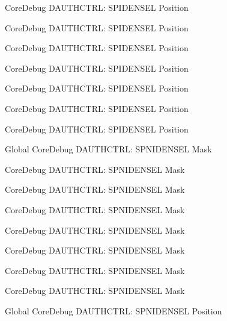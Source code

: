 \begin{DoxyRefList}
\label{deprecated__deprecated000284}%
%
Core\+Debug DAUTHCTRL\+: SPIDENSEL Position 

\label{deprecated__deprecated000439}%
%
Core\+Debug DAUTHCTRL\+: SPIDENSEL Position 

\label{deprecated__deprecated000542}%
%
Core\+Debug DAUTHCTRL\+: SPIDENSEL Position 

\label{deprecated__deprecated000363}%
%
Core\+Debug DAUTHCTRL\+: SPIDENSEL Position 

\label{deprecated__deprecated000644}%
%
Core\+Debug DAUTHCTRL\+: SPIDENSEL Position 

\label{deprecated__deprecated000221}%
%
Core\+Debug DAUTHCTRL\+: SPIDENSEL Position 

\label{deprecated__deprecated000091}%
%
Core\+Debug DAUTHCTRL\+: SPIDENSEL Position  
\item[Global \doxylink{group___c_m_s_i_s___s_c_b_gaabb5d6c750c9ec50254134ece2111dcd}{Core\+Debug\+\_\+\+DAUTHCTRL\+\_\+\+SPNIDENSEL\+\_\+\+Msk} ]\label{deprecated__deprecated000142}%
%
Core\+Debug DAUTHCTRL\+: SPNIDENSEL Mask 

\label{deprecated__deprecated000436}%
%
Core\+Debug DAUTHCTRL\+: SPNIDENSEL Mask 

\label{deprecated__deprecated000088}%
%
Core\+Debug DAUTHCTRL\+: SPNIDENSEL Mask 

\label{deprecated__deprecated000360}%
%
Core\+Debug DAUTHCTRL\+: SPNIDENSEL Mask 

\label{deprecated__deprecated000539}%
%
Core\+Debug DAUTHCTRL\+: SPNIDENSEL Mask 

\label{deprecated__deprecated000641}%
%
Core\+Debug DAUTHCTRL\+: SPNIDENSEL Mask 

\label{deprecated__deprecated000218}%
%
Core\+Debug DAUTHCTRL\+: SPNIDENSEL Mask 

\label{deprecated__deprecated000281}%
%
Core\+Debug DAUTHCTRL\+: SPNIDENSEL Mask  
\item[Global \doxylink{group___c_m_s_i_s___s_c_b_ga866734a8e4bec2d6cf091e265c6c0f3d}{Core\+Debug\+\_\+\+DAUTHCTRL\+\_\+\+SPNIDENSEL\+\_\+\+Pos} ]\label{deprecated__deprecated000538}%
%
Core\+Debug DAUTHCTRL\+: SPNIDENSEL Position 


\end{DoxyRefList}
